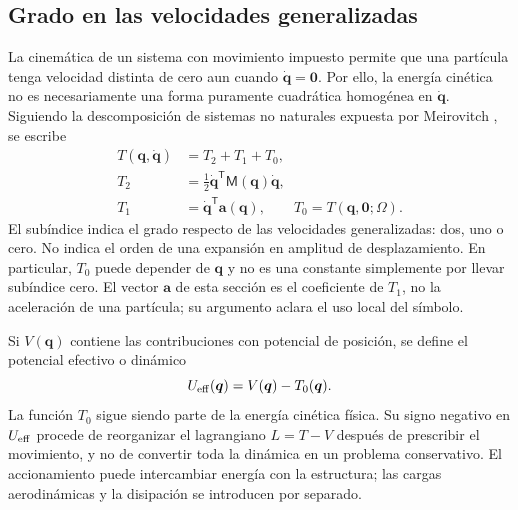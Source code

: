 \documentclass[11pt,a4paper,oneside]{report}
\newcommand{\vct}[1]{\bm{#1}}
\newcommand{\tr}{\mathsf T}
\begin{document}
\subsection{Grado en las velocidades generalizadas}
La cinemática de un sistema con movimiento impuesto permite que una partícula tenga velocidad distinta de cero aun cuando $\dot{\vct q}=\vct0$. Por ello, la energía cinética no es necesariamente una forma puramente cuadrática homogénea en $\dot{\vct q}$. Siguiendo la descomposición de sistemas no naturales expuesta por Meirovitch \cite[sección 4.1]{meirovitch}, se escribe
\begin{align}
 T(\vct q,\dot{\vct q})&=T_2+T_1+T_0,\\
 T_2&=\tfrac12\dot{\vct q}^{\tr}\mathsf M(\vct q)\dot{\vct q},\\
 T_1&=\dot{\vct q}^{\tr}\vct a(\vct q),\qquad
 T_0=T(\vct q,\vct0;\Omega).
 \label{eq:Tdecomp}
\end{align}
El subíndice indica el grado respecto de las velocidades generalizadas: dos, uno o cero. No indica el orden de una expansión en amplitud de desplazamiento. En particular, $T_0$ puede depender de $\vct q$ y no es una constante simplemente por llevar subíndice cero. El vector $\vct a$ de esta sección es el coeficiente de $T_1$, no la aceleración de una partícula; su argumento aclara el uso local del símbolo.

Si $V(\vct q)$ contiene las contribuciones con potencial de posición, se define el potencial efectivo o dinámico
\begin{equation}
 U_{\rm eff}(\vct q)=V(\vct q)-T_0(\vct q).
 \label{eq:Ueff}
\end{equation}
La función $T_0$ sigue siendo parte de la energía cinética física. Su signo negativo en $U_{\rm eff}$ procede de reorganizar el lagrangiano $L=T-V$ después de prescribir el movimiento, y no de convertir toda la dinámica en un problema conservativo. El accionamiento puede intercambiar energía con la estructura; las cargas aerodinámicas y la disipación se introducen por separado.
\end{document}
